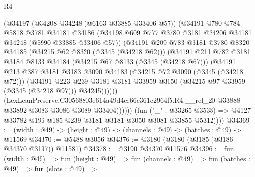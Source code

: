 \begin{lexlean}{R4}
\begin{coremodule}
                    (@34197
                      (@34208 @34248 (@6163 @33885 @33406 @57))
                      (@34191
                        @780
                        @784
                        @5818
                        @3781
                        @34181
                        @34186
                        (@34198
                          @609
                          @777
                          @3780
                          @3181
                          @34206
                          @34181
                          @34248
                          (@5990 @33885 @33406 @57))
                        (@34191
                          @209
                          @783
                          @3181
                          @3780
                          @8320
                          @34185
                          (@34215 @62 @8320 (@3345 (@34218 @62)))
                          (@34191
                            @211
                            @782
                            @3181
                            @3184
                            @8133
                            @34184
                            (@34215 @67 @8133 (@3345 (@34218 @67)))
                            (@34191
                              @213
                              @387
                              @3181
                              @3183
                              @3090
                              @34183
                              (@34215 @72 @3090 (@3345 (@34218 @72)))
                              (@34191
                                @223
                                @239
                                @3181
                                @3181
                                @33959
                                @3050
                                (@34215 @97 @33959 (@3345 (@34218 @97)))
                                @34245))))))
                    (LexLeanPreserve.C30568803e614a49d4ce66c361c2964f5.R4.__rel_20
                      @33888
                      @33892
                      @3083
                      @3086
                      @3089
                      @33404))))))
          (fun ("_" : @33265 @3538) =>
          @4127 @33782 @196 @185 @239 @3181 @3181 @3050 @3081 @33855 @5312))))
@34369 := (width : @49) -> (height : @49) -> (channels : @49) -> (batches : @49) -> @11569
@34370 := @5488 @3056
@34376 := @3180 (@3180 (@3185 (@3186 @34370 @3197)) @11581)
@34378 := @3190 @34370 @11576
@34396 := fun (width : @49) =>
  fun (height : @49) =>
  fun (channels : @49) =>
  fun (batches : @49) =>
  fun (slots : @49) =>

\end{coremodule}
\end{lexlean}
